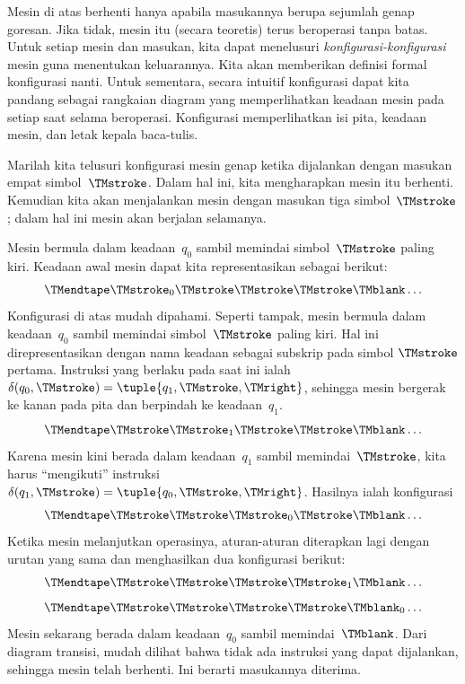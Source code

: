 \documentclass[../../../include/open-logic-section]{subfiles}
\begin{document}
\begin{explain}
Mesin di atas berhenti hanya apabila masukannya berupa sejumlah genap goresan.
Jika tidak, mesin itu (secara teoretis) terus beroperasi tanpa batas. Untuk
setiap mesin dan masukan, kita dapat menelusuri \emph{konfigurasi-konfigurasi}
mesin guna menentukan keluarannya. Kita akan memberikan definisi formal
konfigurasi nanti. Untuk sementara, secara intuitif konfigurasi dapat kita
pandang sebagai rangkaian diagram yang memperlihatkan keadaan mesin pada setiap
saat selama beroperasi. Konfigurasi memperlihatkan isi pita, keadaan mesin, dan
letak kepala baca-tulis.

Marilah kita telusuri konfigurasi mesin genap ketika dijalankan dengan masukan
empat simbol~$\TMstroke$. Dalam hal ini, kita mengharapkan mesin itu berhenti.
Kemudian kita akan menjalankan mesin dengan masukan tiga simbol~$\TMstroke$;
dalam hal ini mesin akan berjalan selamanya.

Mesin bermula dalam keadaan~$q_0$ sambil memindai simbol~$\TMstroke$ paling
kiri. Keadaan awal mesin dapat kita representasikan sebagai berikut:
\[
\TMendtape \TMstroke_0 \TMstroke \TMstroke \TMstroke \TMblank \ldots
\]
Konfigurasi di atas mudah dipahami. Seperti tampak, mesin bermula dalam
keadaan~$q_0$ sambil memindai simbol~$\TMstroke$ paling kiri. Hal ini
direpresentasikan dengan nama keadaan sebagai subskrip pada simbol
$\TMstroke$ pertama. Instruksi yang berlaku pada saat ini ialah
$\delta(q_0, \TMstroke) = \tuple{q_1, \TMstroke, \TMright}$, sehingga mesin
bergerak ke kanan pada pita dan berpindah ke keadaan~$q_1$.
\[
\TMendtape \TMstroke \TMstroke_1 \TMstroke \TMstroke \TMblank \ldots
\]
Karena mesin kini berada dalam keadaan~$q_1$ sambil memindai~$\TMstroke$, kita
harus ``mengikuti'' instruksi $\delta(q_1, \TMstroke) = \tuple{q_0,
  \TMstroke, \TMright}$. Hasilnya ialah konfigurasi
\[
\TMendtape \TMstroke \TMstroke \TMstroke_0 \TMstroke \TMblank \ldots
\]
Ketika mesin melanjutkan operasinya, aturan-aturan diterapkan lagi dengan
urutan yang sama dan menghasilkan dua konfigurasi berikut:
\[
\TMendtape \TMstroke \TMstroke \TMstroke \TMstroke_1 \TMblank \ldots
\]
\[
\TMendtape \TMstroke \TMstroke \TMstroke \TMstroke \TMblank_0 \ldots
\]
Mesin sekarang berada dalam keadaan~$q_0$ sambil memindai~$\TMblank$. Dari
diagram transisi, mudah dilihat bahwa tidak ada instruksi yang dapat dijalankan,
sehingga mesin telah berhenti. Ini berarti masukannya diterima.


\end{explain}
\end{document}
